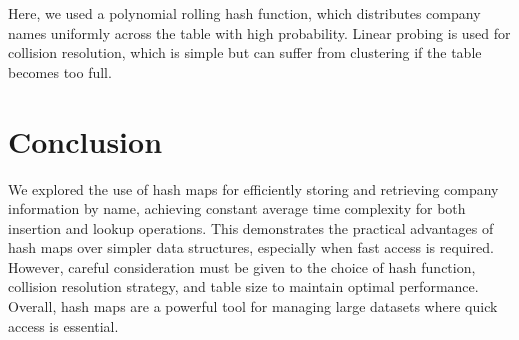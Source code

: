 \documentclass{article}
\begin{document}
Here, we used a polynomial rolling hash function, which distributes company names uniformly across the table with high probability. Linear probing is used for collision resolution, which is simple but can suffer from clustering if the table becomes too full.

\section{Conclusion}
\label{conclusion}

We explored the use of hash maps for efficiently storing and retrieving company information by name, achieving constant average time complexity for both insertion and lookup operations. This demonstrates the practical advantages of hash maps over simpler data structures, especially when fast access is required. However, careful consideration must be given to the choice of hash function, collision resolution strategy, and table size to maintain optimal performance. Overall, hash maps are a powerful tool for managing large datasets where quick access is essential.
\end{document}
